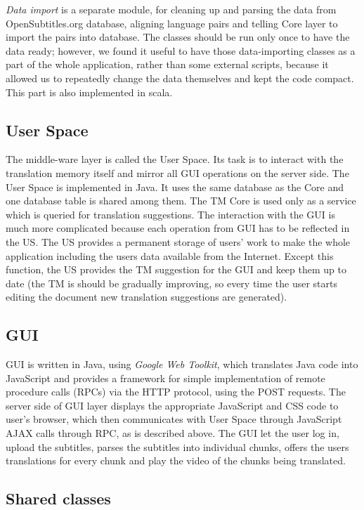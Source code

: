 \emph{Data import} is a separate module, for cleaning up and parsing the data from OpenSubtitles.org database, aligning language pairs and telling Core layer to import the pairs into database. The classes should be run only once to have the data ready; however, we found it useful to have those data-importing classes as a part of the whole application, rather than some external scripts, because it allowed us to repeatedly change the data themselves and kept the code compact. This part is also implemented in scala.

\subsection*{User Space}

The middle-ware layer is called the User Space. Its task is to interact with the translation memory itself and mirror all GUI operations on the server side. The User Space is implemented in Java. It uses the same database as the Core and one database table is shared among them. The TM Core is used only as a service which is queried for translation suggestions. The interaction with the GUI is much more complicated because each operation from GUI has to be reflected in the US. The US provides a permanent storage of users' work to make the whole application including the users data available from the Internet. Except this function, the US provides the TM suggestion for the GUI and keep them up to date (the TM is should be gradually improving, so every time the user starts editing the document new translation suggestions are generated).

\subsection*{GUI}


GUI is written in Java, using \emph{Google Web Toolkit}, which translates Java code into JavaScript and provides a framework for simple implementation of remote procedure calls (RPCs) via the HTTP protocol, using the POST requests. The server side of GUI layer displays the appropriate JavaScript and CSS code to user's browser, which then communicates with User Space through JavaScript AJAX calls through RPC, as is described above. The GUI let the user log in, upload the subtitles, parses the subtitles into individual chunks, offers the users translations for every chunk and play the video of the chunks being translated.

\subsection*{Shared classes}

